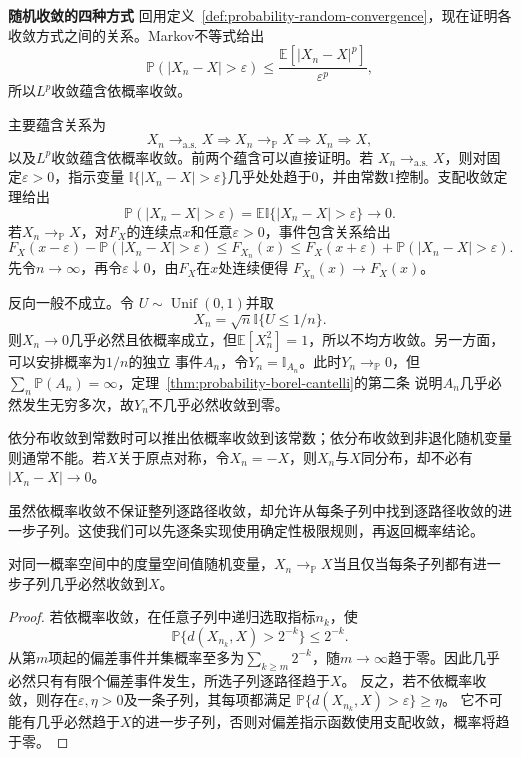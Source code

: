 \par\medskip\noindent\textbf{随机收敛的四种方式}\quad
回用定义~\ref{def:probability-random-convergence}，现在证明各收敛方式之间的关系。Markov不等式给出
\[ \mathbb{P}(|X_n-X|>\varepsilon)
  \leq\frac{\mathbb{E}[|X_n-X|^p]}{\varepsilon^p}, \]
所以\(L^p\)收敛蕴含依概率收敛。

主要蕴含关系为
\[ X_n\to_{\mathrm{a.s.}}X
  \Longrightarrow X_n\to_{\mathbb{P}}X\Longrightarrow X_n\Rightarrow X, \]
以及\(L^p\)收敛蕴含依概率收敛。前两个蕴含可以直接证明。若
\(X_n\to_{\mathrm{a.s.}}X\)，则对固定\(\varepsilon>0\)，指示变量
\(\mathbb{I}\{|X_n-X|>\varepsilon\}\)几乎处处趋于\(0\)，并由常数\(1\)控制。支配收敛定理给出
\[
  \mathbb{P}(|X_n-X|>\varepsilon)
  =\mathbb{E}\mathbb{I}\{|X_n-X|>\varepsilon\}\to0.
\]
若\(X_n\to_{\mathbb{P}}X\)，对\(F_X\)的连续点\(x\)和任意\(\varepsilon>0\)，事件包含关系给出
\[
  F_X(x-\varepsilon)-\mathbb{P}(|X_n-X|>\varepsilon)
  \leq F_{X_n}(x)
  \leq
  F_X(x+\varepsilon)+\mathbb{P}(|X_n-X|>\varepsilon).
\]
先令\(n\to\infty\)，再令\(\varepsilon\downarrow0\)，由\(F_X\)在\(x\)处连续便得
\(F_{X_n}(x)\to F_X(x)\)。

反向一般不成立。令
\(U\sim\operatorname{Unif}(0,1)\)并取
\[ X_n=\sqrt{n}\mathbb{I}\{U\leq1/n\}. \]
则\(X_n\to0\)几乎必然且依概率成立，但\(\mathbb{E}[X_n^2]=1\)，所以不均方收敛。另一方面，可以安排概率为\(1/n\)的独立
事件\(A_n\)，令\(Y_n=\mathbb{I}_{A_n}\)。此时\(Y_n\to_{\mathbb{P}}0\)，但
\(\sum_n\mathbb{P}(A_n)=\infty\)，定理~\ref{thm:probability-borel-cantelli}的第二条
说明\(A_n\)几乎必然发生无穷多次，故\(Y_n\)不几乎必然收敛到零。

依分布收敛到常数时可以推出依概率收敛到该常数；依分布收敛到非退化随机变量则通常不能。若\(X\)关于原点对称，令\(X_n=-X\)，则\(X_n\)与\(X\)同分布，却不必有\(|X_n-X|\to0\)。

虽然依概率收敛不保证整列逐路径收敛，却允许从每条子列中找到逐路径收敛的进一步子列。这使我们可以先逐条实现使用确定性极限规则，再返回概率结论。
\begin{lemma}[依概率收敛的子列判据]
 \label{lem:rv-probability-subsequence}
 对同一概率空间中的度量空间值随机变量，\(X_n\to_{\mathbb P}X\)当且仅当每条子列都有进一步子列几乎必然收敛到\(X\)。
\end{lemma}
\begin{proof}
若依概率收敛，在任意子列中递归选取指标\(n_k\)，使
\[
  \mathbb P\{d(X_{n_k},X)>2^{-k}\}\leq2^{-k}.
\]
从第\(m\)项起的偏差事件并集概率至多为\(\sum_{k\geq m}2^{-k}\)，随\(m\to\infty\)趋于零。因此几乎必然只有有限个偏差事件发生，所选子列逐路径趋于\(X\)。
反之，若不依概率收敛，则存在\(\varepsilon,\eta>0\)及一条子列，其每项都满足
\(\mathbb P\{d(X_{n_k},X)>\varepsilon\}\geq\eta\)。
它不可能有几乎必然趋于\(X\)的进一步子列，否则对偏差指示函数使用支配收敛，概率将趋于零。
\end{proof}

